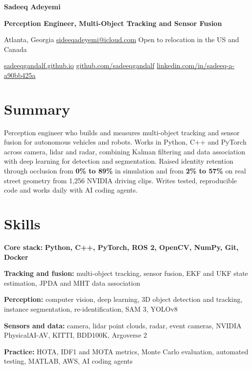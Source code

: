 \documentclass[10pt,letterpaper]{article}
\newcommand{\BodySize}{9.6}     %
\newcommand{\skill}[2]{\textbf{#1:} #2\par\vspace{1.4pt}}
\newcommand{\key}[1]{\textbf{#1}}          %
\newcommand{\sep}{\enspace\textbar\enspace}
\newcommand{\AV}{\mbox{A}\mbox{V}}
\newcommand{\AWS}{\mbox{A}\mbox{W}\mbox{S}}
\begin{document}
\fontsize{\BodySize}{11.6}\selectfont

\begin{center}
  {\fontsize{21}{24}\selectfont\bfseries Sadeeq Adeyemi}\par\vspace{3.5pt}
  {\fontsize{11}{13}\selectfont\bfseries Perception Engineer, Multi-Object Tracking and Sensor Fusion}\par\vspace{3pt}
  Atlanta, Georgia \sep \href{mailto:sideeqadeyemi@icloud.com}{sideeqadeyemi@icloud.com} \sep Open to relocation in the US and Canada\par\vspace{1.5pt}
  \href{https://sadeeqgandalf.github.io}{sadeeqgandalf.github.io} \sep
  \href{https://github.com/sadeeqgandalf}{github.com/sadeeqgandalf} \sep
  \href{https://www.linkedin.com/in/sadeeq-a-a90bb425a}{linkedin.com/in/sadeeq-a-a90bb425a}
\end{center}
\vspace{-3pt}

\section{Summary}
Perception engineer who builds and measures multi-object tracking and sensor fusion for autonomous vehicles and robots.
Works in Python, C++ and PyTorch across camera, lidar and radar, combining Kalman filtering and data association with deep
learning for detection and segmentation. Raised identity retention through occlusion from \key{0\% to 89\%} in simulation and
from \key{2\% to 57\%} on real street geometry from 1,256 NVIDIA driving clips. Writes tested, reproducible code and works
daily with AI coding agents.

\section{Skills}
\skill{Core stack}{\textbf{Python, C++, PyTorch, ROS 2, OpenCV, NumPy, Git, Docker}}
\skill{Tracking and fusion}{multi-object tracking, sensor fusion, EKF and UKF state estimation, JPDA and MHT data association}
\skill{Perception}{computer vision, deep learning, 3D object detection and tracking, instance segmentation, re-identification, SAM 3, YOLOv8}
\skill{Sensors and data}{camera, lidar point clouds, radar, event cameras, NVIDIA PhysicalAI-\AV, KITTI, BDD100K, Argoverse 2}
\skill{Practice}{HOTA, IDF1 and MOTA metrics, Monte Carlo evaluation, automated testing, MATLAB, \AWS, AI coding agents}
\end{document}
